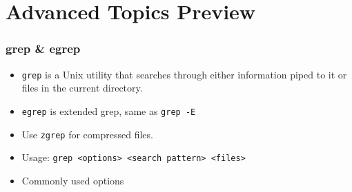 \documentclass[slidestop,mathserif,compress,xcolor=svgnames]{beamer}
\begin{document}
\section{Advanced Topics Preview}
\begin{frame}
  \frametitle{\small grep \& egrep}
  \begin{itemize}
    \item \texttt{grep} is a Unix utility that searches through either information piped to it or files in the current directory.
    \item \texttt{egrep} is extended grep, same as \texttt{grep -E}
    \item Use \texttt{zgrep} for compressed files.
    \item Usage: \texttt{grep <options> <search pattern> <files>} 
    \item Commonly used options
  \end{itemize}
\end{frame}
\end{document}

